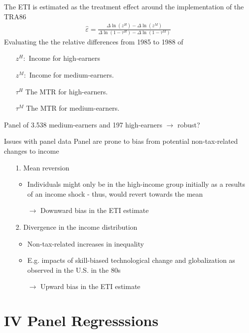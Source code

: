 \documentclass[8pt]{beamer}
\begin{document}
\begin{frame}{\citet{feldstein1995effect}}
  The ETI is estimated as the treatment effect around the implementation of the TRA86
    \begin{align}
      \hat{\varepsilon}=\frac{\Delta \ln(z^H) - \Delta \ln(z^M)}{\Delta \ln(1-\tau^H) - \Delta \ln(1-\tau^M)}
      \label{eq:DD}
    \end{align}
  Evaluating the the relative differences from 1985 to 1988 of
  \begin{itemize}
    \item[$z^H:$] Income for high-earners
    \item[$z^M:$] Income for medium-earners.
    \item[$\tau^H$] The MTR for high-earners.
    \item[$\tau^M$] The MTR for medium-earners.
  \end{itemize}
  Panel of 3.538 medium-earners and 197 high-earners $\rightarrow$ robust?
\end{frame}

\begin{frame}{Issues with panel data}
  Panel are prone to bias from potential non-tax-related changes to income
  \begin{itemize}
    \item[1.] Mean reversion
    \begin{itemize}
      \item Individuals might only be in the high-income group initially as a results of an income shock - thus, would revert towards the mean
      \item[$\rightarrow$] Downward bias in the ETI estimate
    \end{itemize}
    \item[2.] Divergence in the income distribution
    \begin{itemize}
      \item Non-tax-related increases in inequality
      \item E.g. impacts of skill-biased technological change and globalization as observed in the U.S. in the 80s \citep{gruber2002elasticity}
      \item[$\rightarrow$] Upward bias in the ETI estimate
    \end{itemize}
  \end{itemize}
\end{frame}


\section{IV Panel Regresssions}
\end{document}
